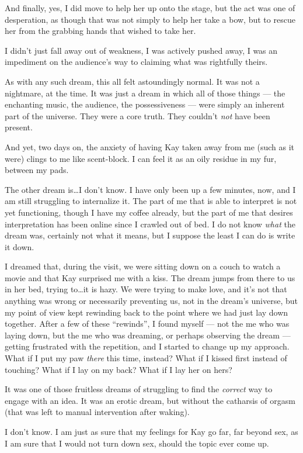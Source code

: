 And finally, yes, I did move to help her up onto the stage, but the act was one of desperation, as though that was not simply to help her take a bow, but to rescue her from the grabbing hands that wished to take her.

I didn't just fall away out of weakness, I was actively pushed away, I was an impediment on the audience's way to claiming what was rightfully theirs.

As with any such dream, this all felt astoundingly normal. It was not a nightmare, at the time. It was just a dream in which all of those things --- the enchanting music, the audience, the possessiveness --- were simply an inherent part of the universe. They were a core truth. They couldn't \emph{not} have been present.

And yet, two days on, the anxiety of having Kay taken away from me (such as it were) clings to me like scent-block. I can feel it as an oily residue in my fur, between my pads.

The other dream is\ldots I don't know. I have only been up a few minutes, now, and I am still struggling to internalize it. The part of me that is able to interpret is not yet functioning, though I have my coffee already, but the part of me that desires interpretation has been online since I crawled out of bed. I do not know \emph{what} the dream was, certainly not what it means, but I suppose the least I can do is write it down.

I dreamed that, during the visit, we were sitting down on a couch to watch a movie and that Kay surprised me with a kiss. The dream jumps from there to us in her bed, trying to\ldots it is hazy. We were trying to make love, and it's not that anything was wrong or necessarily preventing us, not in the dream's universe, but my point of view kept rewinding back to the point where we had just lay down together. After a few of these ``rewinds'', I found myself --- not the me who was laying down, but the me who was dreaming, or perhaps observing the dream --- getting frustrated with the repetition, and I started to change up my approach. What if I put my paw \emph{there} this time, instead? What if I kissed first instead of touching? What if I lay on my back? What if I lay her on hers?

It was one of those fruitless dreams of struggling to find the \emph{correct} way to engage with an idea. It was an erotic dream, but without the catharsis of orgasm (that was left to manual intervention after waking).

I don't know. I am just as sure that my feelings for Kay go far, far beyond sex, as I am sure that I would not turn down sex, should the topic ever come up.

